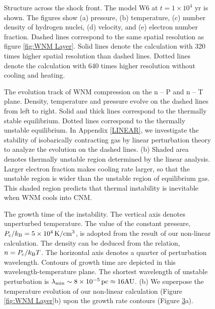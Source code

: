 \begin{figure}[htbp]


\caption{Structure across the shock front.
The model W6 at $t=1\times 10^4$ yr is shown.
The figures show (a) pressure, (b) temperature, (c) number density of
hydrogen nuclei, (d) velocity, and (e) electron number fraction.
Dashed lines correspond to the same spatial resolution as figure 
\protect\ref{fig:WNM Layer}.
Solid lines denote the calculation with 320 times higher spatial
resolution than dashed lines. 
Dotted lines denote the calculation with 640 times higher resolution 
without cooling and heating.
}
\label{fig:shock front}
\end{figure}


\begin{figure}[htbp]
\caption{The evolution track of WNM compression 
on the n -- P and n -- T plane.
Density, temperature and pressure evolve on the dashed lines 
from left to right.
Solid and thick lines correspond to the thermally stable equilibrium.
Dotted lines correspond to the thermally unstable equilibrium. 
In Appendix \protect\ref{LINEAR},
we investigate the stability of isobarically contracting gas
by linear perturbation theory to analyze the evolution on the dashed lines.
(b) Shaded area denotes 
thermally unstable region determined by the linear analysis.
Larger electron fraction makes cooling rate larger,
so that the unstable region is wider than the unstable region of
equilibrium gas.
This shaded region predicts that thermal instability is inevitable
when WNM cools into CNM.}
\label{fig:n-Pw,n-Tw}
\end{figure}

\begin{figure}[htbp]
\caption{The growth time of the instability.
The vertical axis denotes unperturbed temperature.
The value of the constant pressure, 
$P_{\rm c}/k_{\rm B}=5 \times 10^4 \,{\rm K/cm^3}$,
is adopted from the result of our non-linear calculation.
The density can be deduced from the relation, $n=P_{\rm c}/k_{\rm B}T$.
The horizontal axis denotes a quarter of perturbation wavelength.
Contours of growth time are depicted in this wavelength-temperature plane.
The shortest wavelength of unstable perturbation is
$\lambda_{\rm min}\sim 8 \times 10^{-5}\, {\rm pc} \approx 16 {\rm AU}$.
(b) We superpose the temperature evolution of our non-linear calculation 
(Figure \protect\ref{fig:WNM Layer}b)       
upon the growth rate contours (Figure \protect\ref{fig:growth43}a). }
\label{fig:growth43}
\end{figure}

